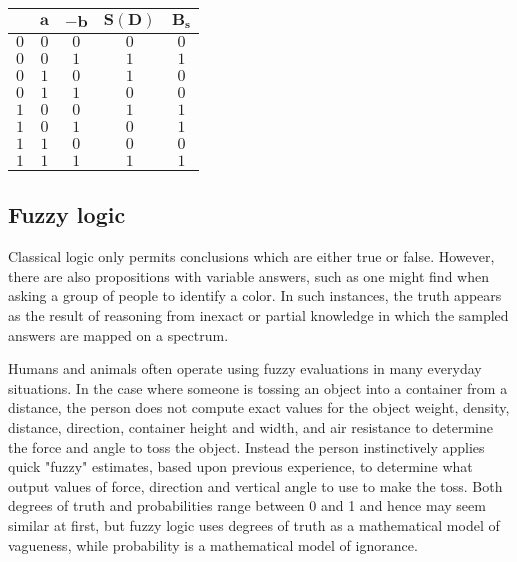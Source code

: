 	\begin{table}[H]
		\centering
		\begin{tabular}{|c|c|c|c|c|}
		\hline
		\rowcolor[HTML]{9B9B9B} 
		\multicolumn{1}{|l|}{\cellcolor[HTML]{9B9B9B}$\pmb{-B_e}$} & \multicolumn{1}{l|}{\cellcolor[HTML]{9B9B9B}$\pmb{a}$} & \multicolumn{1}{l|}{\cellcolor[HTML]{9B9B9B}$\pmb{-b}$} & \multicolumn{1}{l|}{\cellcolor[HTML]{9B9B9B}$\pmb{S(D)}$} & \multicolumn{1}{l|}{\cellcolor[HTML]{9B9B9B}$\pmb{B_s}$}\\ \hline
		$0$ & $0$ & $0$ & $0$ & $0$\\ \hline
		$0$ & $0$ & $1$ & $1$ & $1$\\ \hline
		$0$ & $1$ & $0$ & $1$ & $0$ \\ \hline
		$0$ & $1$ & $1$ & $0$ & $0$\\ \hline
		$1$ & $0$ & $0$ & $1$ & $1$\\ \hline
		$1$ & $0$ & $1$ & $0$ & $1$\\ \hline
		$1$ & $1$ & $0$ & $0$ & $0$\\ \hline
		$1$ & $1$ & $1$ & $1$ & $1$\\ \hline
		\end{tabular}
	\end{table}
	
	\pagebreak
	\subsection{Fuzzy logic}\label{fuzzy logic}
	Classical logic only permits conclusions which are either true or false. However, there are also propositions with variable answers, such as one might find when asking a group of people to identify a color. In such instances, the truth appears as the result of reasoning from inexact or partial knowledge in which the sampled answers are mapped on a spectrum.
	
	Humans and animals often operate using fuzzy evaluations in many everyday situations. In the case where someone is tossing an object into a container from a distance, the person does not compute exact values for the object weight, density, distance, direction, container height and width, and air resistance to determine the force and angle to toss the object. Instead the person instinctively applies quick "fuzzy" estimates, based upon previous experience, to determine what output values of force, direction and vertical angle to use to make the toss.
Both degrees of truth and probabilities range between 0 and 1 and hence may seem similar at first, but fuzzy logic uses degrees of truth as a mathematical model of vagueness, while probability is a mathematical model of ignorance.

